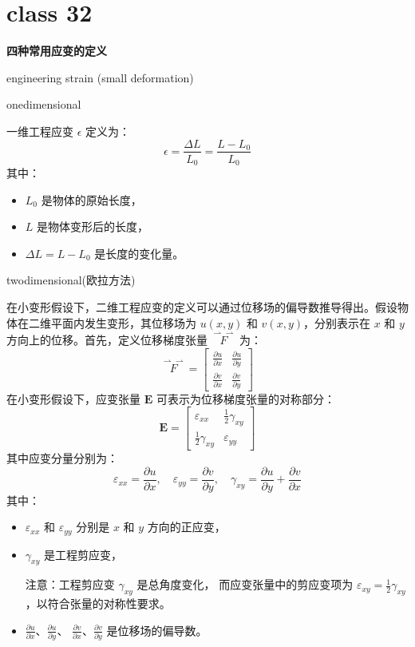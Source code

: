 \documentclass[12pt, a4paper, oneside, UTF8]{ctexbook}  %
\newcommand{\vvec}{\overset{\rightharpoonup\!\!\!\! \rightharpoonup}}
\begin{document}
\section{class 32}
\begin{center}
	\textbf{四种常用应变的定义}
\end{center}
\begin{defn}
	engineering strain (small deformation)
\end{defn}
\begin{example}
	one\textminus dimensional

一维工程应变 \(\epsilon\) 定义为：
\[
\epsilon = \frac{\Delta L}{L_0} = \frac{L - L_0}{L_0}
\]
其中：
\begin{itemize}
    \item \( L_0 \) 是物体的原始长度，
    \item \( L \) 是物体变形后的长度，
    \item \( \Delta L = L - L_0 \) 是长度的变化量。
\end{itemize}
\end{example}
\begin{example}
	two\textminus dimensional(欧拉方法)

	在小变形假设下，二维工程应变的定义可以通过位移场的偏导数推导得出。假设物体在二维平面内发生变形，其位移场为 \( u(x, y) \) 和 \( v(x, y) \)，分别表示在 \( x \) 和 \( y \) 方向上的位移。首先，定义位移梯度张量 \( \vvec{F} \) 为：
	\[
	\vvec{F} = \begin{bmatrix}
	\frac{\partial u}{\partial x} & \frac{\partial u}{\partial y} \\
	\frac{\partial v}{\partial x} & \frac{\partial v}{\partial y}
	\end{bmatrix}
	\]
	在小变形假设下，应变张量 \( \mathbf{E} \) 可表示为位移梯度张量的对称部分：
	\[
	\mathbf{E} = \begin{bmatrix}
		\varepsilon_{xx} & \frac{1}{2} \gamma_{xy} \\
		\frac{1}{2} \gamma_{xy} & \varepsilon_{yy}
		\end{bmatrix}
	\]
	其中应变分量分别为：
	\[
	\varepsilon_{xx} = \frac{\partial u}{\partial x}, \quad \varepsilon_{yy} = \frac{\partial v}{\partial y}, \quad \gamma_{xy} = \frac{\partial u}{\partial y} + \frac{\partial v}{\partial x}
	\]
	其中：
	\begin{itemize}
		\item \(\varepsilon_{xx}\) 和 \(\varepsilon_{yy}\) 分别是 \(x\) 和 \(y\) 方向的正应变，
		\item \(\gamma_{xy}\) 是工程剪应变，
		
		注意：工程剪应变 \( \gamma_{xy} \) 是总角度变化，
		而应变张量中的剪应变项为 \( \varepsilon_{xy}=\frac{1}{2} \gamma_{xy} \)，以符合张量的对称性要求。
		\item \(\frac{\partial u}{\partial x}\)、\(\frac{\partial u}{\partial y}\)、
		\(\frac{\partial v}{\partial x}\)、\(\frac{\partial v}{\partial y}\) 是位移场的偏导数。
	\end{itemize}
\end{example}
\end{document}
